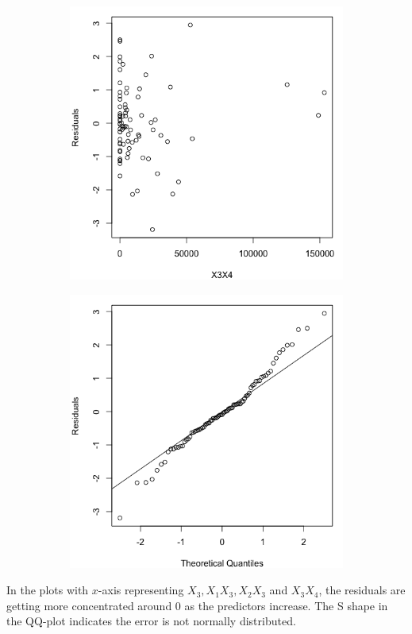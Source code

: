 \documentclass[10pt]{report}
\begin{document}
\begin{enumerate}
\begin{figure}[H]
\begin{subfigure}[b]{.25\linewidth}
		\end{subfigure}%
		\begin{subfigure}[b]{.25\linewidth}
			\includegraphics[width=\linewidth]{p2/18e_x3x4.png} 
		\end{subfigure}%
		\begin{subfigure}[b]{.25\linewidth}
			\includegraphics[width=\linewidth]{p2/18eqq.png} 
		\end{subfigure}
	\end{figure}
	In the plots with $x$-axis representing $X_3, X_1 X_3, X_2 X_3$ and $X_3 X_4$, the residuals are getting more concentrated around 0 as the predictors increase. The S shape in the QQ-plot indicates the error is not normally distributed.
	

\end{enumerate}
\end{document}
